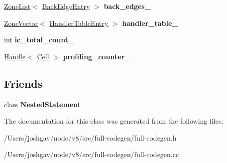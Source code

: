 \begin{DoxyCompactItemize}
\item 
\hyperlink{classv8_1_1internal_1_1_zone_list}{Zone\+List}$<$ \hyperlink{structv8_1_1internal_1_1_full_code_generator_1_1_back_edge_entry}{Back\+Edge\+Entry} $>$ {\bfseries back\+\_\+edges\+\_\+}\hypertarget{classv8_1_1internal_1_1_full_code_generator_ab31e799e16e354d026833d44c0b238fe}{}\label{classv8_1_1internal_1_1_full_code_generator_ab31e799e16e354d026833d44c0b238fe}

\item 
\hyperlink{classv8_1_1internal_1_1_zone_vector}{Zone\+Vector}$<$ \hyperlink{structv8_1_1internal_1_1_full_code_generator_1_1_handler_table_entry}{Handler\+Table\+Entry} $>$ {\bfseries handler\+\_\+table\+\_\+}\hypertarget{classv8_1_1internal_1_1_full_code_generator_aba44d504d0340a7ccc2ffc2f3f9302e5}{}\label{classv8_1_1internal_1_1_full_code_generator_aba44d504d0340a7ccc2ffc2f3f9302e5}

\item 
int {\bfseries ic\+\_\+total\+\_\+count\+\_\+}\hypertarget{classv8_1_1internal_1_1_full_code_generator_ad8c52befe90cf82ef928496e0f1d703f}{}\label{classv8_1_1internal_1_1_full_code_generator_ad8c52befe90cf82ef928496e0f1d703f}

\item 
\hyperlink{classv8_1_1internal_1_1_handle}{Handle}$<$ \hyperlink{classv8_1_1internal_1_1_cell}{Cell} $>$ {\bfseries profiling\+\_\+counter\+\_\+}\hypertarget{classv8_1_1internal_1_1_full_code_generator_a5cddc535f893ff9f549e643f7e2f2b3e}{}\label{classv8_1_1internal_1_1_full_code_generator_a5cddc535f893ff9f549e643f7e2f2b3e}

\end{DoxyCompactItemize}
\subsection*{Friends}
\begin{DoxyCompactItemize}
\item 
class {\bfseries Nested\+Statement}\hypertarget{classv8_1_1internal_1_1_full_code_generator_a37802c943aa0c4c8effa841248b479f2}{}\label{classv8_1_1internal_1_1_full_code_generator_a37802c943aa0c4c8effa841248b479f2}

\end{DoxyCompactItemize}


The documentation for this class was generated from the following files\+:\begin{DoxyCompactItemize}
\item 
/\+Users/joshgav/node/v8/src/full-\/codegen/full-\/codegen.\+h\item 
/\+Users/joshgav/node/v8/src/full-\/codegen/full-\/codegen.\+cc\end{DoxyCompactItemize}
